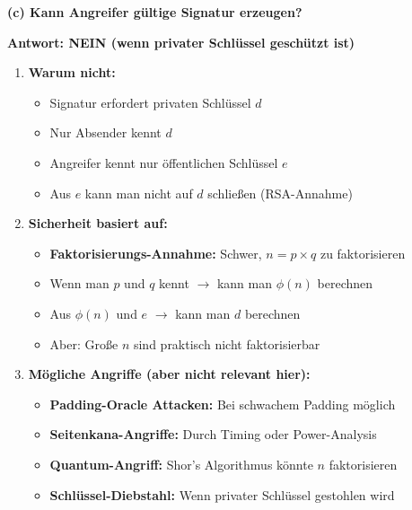 \documentclass[12pt,a4paper]{article}
\begin{document}
\begin{tcolorbox}[colback=solutionbg, colframe=black!30]

\textbf{(c) Kann Angreifer gültige Signatur erzeugen?} \checkmark

\textbf{Antwort: NEIN (wenn privater Schlüssel geschützt ist)}

\begin{enumerate}[1.]
    \item \textbf{Warum nicht:}
    \begin{itemize}
        \item Signatur erfordert privaten Schlüssel $d$
        \item Nur Absender kennt $d$
        \item Angreifer kennt nur öffentlichen Schlüssel $e$
        \item Aus $e$ kann man nicht auf $d$ schließen (RSA-Annahme)
    \end{itemize}
    
    \item \textbf{Sicherheit basiert auf:}
    \begin{itemize}
        \item \textbf{Faktorisierungs-Annahme:} Schwer, $n = p \times q$ zu faktorisieren
        \item Wenn man $p$ und $q$ kennt $\to$ kann man $\phi(n)$ berechnen
        \item Aus $\phi(n)$ und $e$ $\to$ kann man $d$ berechnen
        \item Aber: Große $n$ sind praktisch nicht faktorisierbar
    \end{itemize}
    
    \item \textbf{Mögliche Angriffe (aber nicht relevant hier):}
    \begin{itemize}
        \item \textbf{Padding-Oracle Attacken:} Bei schwachem Padding möglich
        \item \textbf{Seitenkana-Angriffe:} Durch Timing oder Power-Analysis
        \item \textbf{Quantum-Angriff:} Shor's Algorithmus könnte $n$ faktorisieren
        \item \textbf{Schlüssel-Diebstahl:} Wenn privater Schlüssel gestohlen wird
    \end{itemize}
\end{enumerate}

\end{tcolorbox}
\end{document}
